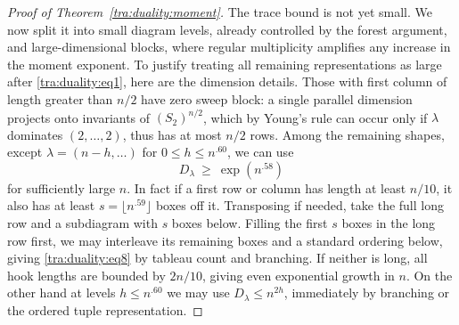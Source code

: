 \begin{proof}[Proof of Theorem~\ref{tra:duality:moment}]\label{tra:duality:moment-proof}
\label{tra:duality:moment-induction-and-completion}
The trace bound is not yet small. We now split it into small diagram levels, already controlled by the forest argument, and large-dimensional blocks, where regular multiplicity amplifies any increase in the moment exponent. To justify treating all remaining representations as large after \eqref{tra:duality:eq1}, here are the dimension details. Those with first column of length greater than \(n/2\) have zero sweep block: a single parallel dimension projects onto invariants of \((S_2)^{n/2}\), which by Young's rule can occur only if \(\lambda\) dominates \((2,\ldots,2)\), thus has at most \(n/2\) rows. Among the remaining shapes, except \(\lambda=(n-h,\ldots)\) for \(0\le h\le n^{.60}\), we can use
\begin{equation}
                           D_\lambda\ \ge\ \exp(n^{.58})            \label{tra:duality:eq8}
\end{equation}
for sufficiently large \(n\). In fact if a first row or column has length at least \(n/10\), it also has at least \(s=\lfloor n^{.59}\rfloor\) boxes off it. Transposing if needed, take the full long row and a subdiagram with \(s\) boxes below. Filling the first \(s\) boxes in the long row first, we may interleave its remaining boxes and a standard ordering below, giving \eqref{tra:duality:eq8} by tableau count and branching. If neither is long, all hook lengths are bounded by \(2n/10\), giving even exponential growth in \(n\). On the other hand at levels \(h\le n^{.60}\) we may use \(D_\lambda\le n^{2h}\), immediately by branching or the ordered tuple representation.


\end{proof}
